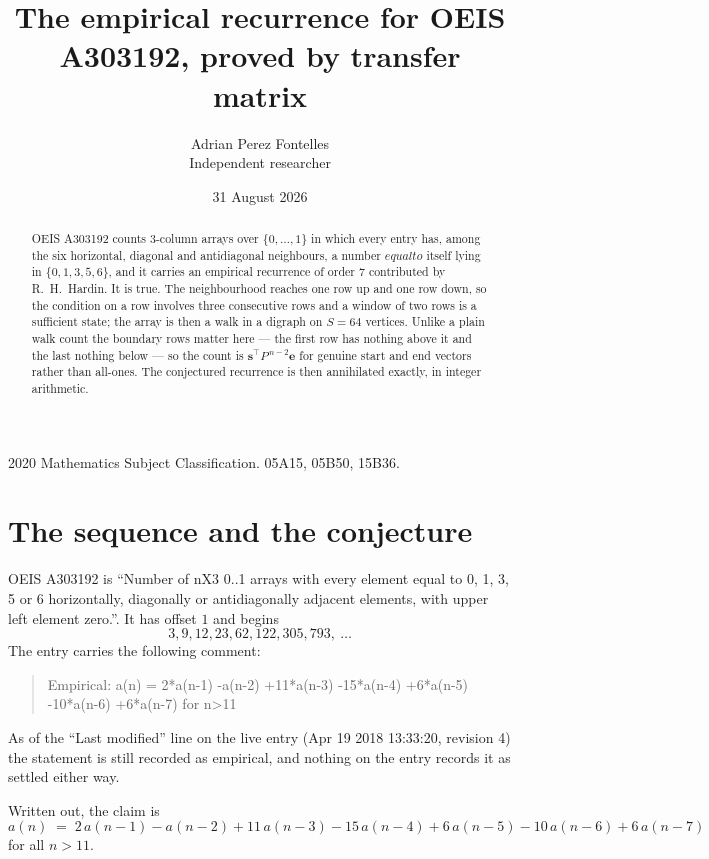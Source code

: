 \documentclass[11pt,a4paper]{article}
\title{The empirical recurrence for OEIS A303192, proved by transfer matrix}
\author{Adrian Perez Fontelles\\ \small Independent researcher}
\date{31 August 2026}
\theoremstyle{plain}
\theoremstyle{definition}
\begin{document}
\maketitle

\begin{abstract}
OEIS A303192 counts $3$-column arrays over $\{0,\dots,1\}$ in which every entry has,
among the six horizontal, diagonal and antidiagonal neighbours, a number $equal to$ itself lying in $\{0,1,3,5,6\}$, and it carries an empirical
recurrence of order $7$ contributed by R.~H.~Hardin. It is true. The neighbourhood
reaches one row up and one row down, so the condition on a row involves three consecutive
rows and a window of two rows is a sufficient state; the array is then a walk in a digraph
on $S=64$ vertices. Unlike a plain walk count the boundary rows matter here --- the first
row has nothing above it and the last nothing below --- so the count is
$\mathbf{s}^{\!\top}P^{\,n-2}\mathbf{e}$ for genuine start and end vectors rather than
all-ones. The conjectured recurrence is then annihilated exactly, in integer arithmetic.
\end{abstract}

\noindent\small 2020 Mathematics Subject Classification. 05A15, 05B50, 15B36.\normalsize

\section{The sequence and the conjecture}

OEIS A303192 is ``Number of nX3 0..1 arrays with every element equal to 0, 1, 3, 5 or 6 horizontally, diagonally or antidiagonally adjacent elements, with upper left element zero.''. It has offset
$1$ and begins
\[
3, 9, 12, 23, 62, 122, 305, 793,\ \dots
\]
The entry carries the following comment:
\begin{quote}\small
Empirical: a(n) = 2*a(n-1) -a(n-2) +11*a(n-3) -15*a(n-4) +6*a(n-5) -10*a(n-6) +6*a(n-7) for n>11
\end{quote}
As of the ``Last modified'' line on the live entry (Apr 19 2018 13:33:20, revision
4) the statement is still recorded as empirical, and nothing on the entry
records it as settled either way.

Written out, the claim is
\begin{equation}\label{eq:conj}
a(n)\;=\;2\,a(n-1) - a(n-2) + 11\,a(n-3) - 15\,a(n-4) + 6\,a(n-5) - 10\,a(n-6) + 6\,a(n-7)
\end{equation}
for all $n>11$.
\end{document}
